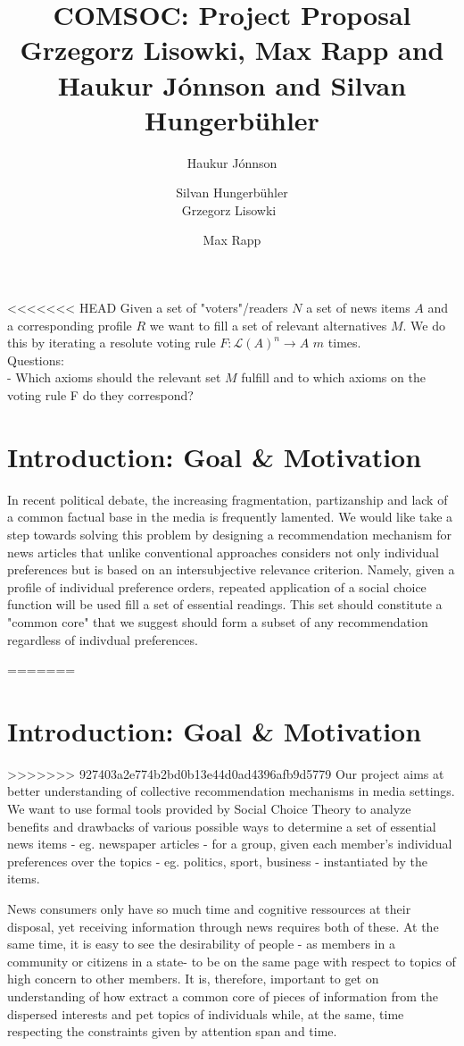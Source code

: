 \documentclass[10pt,a4paper]{article}
\author{
    Haukur J{\'o}nnson  \textttt{Haukur's email address}
    \and
    Silvan Hungerb{\"u}hler \textttt{Silcan's email address}

    Grzegorz Lisowki\   \textttt{greg's email address}
    \and
    Max Rapp    \textttt{maxgrapp@googlemail.com}

}
\title{%
  COMSOC: Project Proposal \\
  \small Grzegorz Lisowki, Max Rapp and Haukur J{\'o}nnson and Silvan Hungerb{\"u}hler }
\date{}
\begin{document}
\maketitle
<<<<<<< HEAD
Given a set of "voters"/readers $N$ a set of news items $A$ and a corresponding profile $R$ we want to fill a set of relevant alternatives $M$. We do this by iterating a resolute voting rule $F:\mathcal{L}(A)^n \rightarrow A$ $m$ times.\\

Questions:\\
- Which axioms should the relevant set $M$ fulfill and to which axioms on the voting rule F do they correspond?
\section*{Introduction: Goal \& Motivation}

In recent political debate, the increasing fragmentation, partizanship and lack of a common factual base in the media is frequently lamented. We would like take a step towards solving this problem by designing a recommendation mechanism for news articles that unlike conventional approaches considers not only individual preferences but is based on an intersubjective relevance criterion. Namely, given a profile of individual preference orders, repeated application of a social choice function will be used fill a set of essential readings. This set should constitute a "common core" that we suggest should form a subset of any recommendation regardless of indivdual preferences.

=======
\section{Introduction: Goal \& Motivation}
>>>>>>> 927403a2e774b2bd0b13e44d0ad4396afb9d5779
Our project aims at better understanding of collective recommendation mechanisms in media settings. We want to use formal tools provided by Social Choice Theory to analyze benefits and drawbacks of various possible ways to determine a set of essential news items - eg. newspaper articles - for a group, given each member's individual preferences over the topics - eg. politics, sport, business - instantiated by the items.

News consumers only have so much time and cognitive ressources at their disposal, yet receiving information through news requires both of these. At the same time, it is easy to see the desirability of people - as members in a community or citizens in a state- to be on the same page with respect to topics of high concern to other members. It is, therefore, important to get on understanding of how extract a common core of pieces of information from the dispersed interests and pet topics of individuals while, at the same, time respecting the constraints given by attention span and time.
\end{document}
